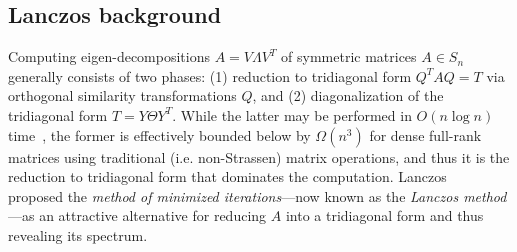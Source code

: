 \documentclass[10pt]{article}
\numberwithin{equation}{section}
\newcommand{\+}{%
	\raisebox{0.18ex}{\scaleobj{0.55}{+}}
}
\DeclareMathOperator*{\argmin}{arg\,min}
\theoremstyle{definition}
\theoremstyle{definition}
\begin{document}
\subsection*{Lanczos background}
Computing eigen-decompositions $A = V \Lambda V^T$ of symmetric matrices $A \in S_n$ generally consists of two phases: (1) reduction to tridiagonal form $Q^T A Q = T$ via orthogonal similarity transformations $Q$, and (2) diagonalization of the tridiagonal form $T = Y \Theta Y^T$. 
While the latter may be performed in $O(n \log n)$ time~\cite{gu1995divide}, the former is effectively bounded below by $\Omega(n^3)$ for dense full-rank matrices using traditional (i.e. non-Strassen) matrix operations, and thus it is the reduction to tridiagonal form that dominates the computation. 
Lanczos~\cite{lanczos1950iteration} proposed the \emph{method of minimized iterations}---now known as the \emph{Lanczos method}---as an attractive alternative for reducing $A$ into a tridiagonal form and thus revealing its spectrum. 
 
\end{document}
